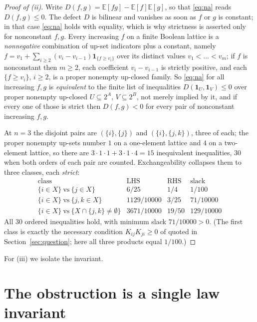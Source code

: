 \documentclass[11pt]{amsart}
\theoremstyle{remark}
\begin{document}
\begin{proof}[Proof of (ii)]
Write $D(f,g)=\mathbb E[fg]-\mathbb E[f]\mathbb E[g]$, so that \eqref{eq:na} reads
$D(f,g)\le0$. The defect $D$ is bilinear and vanishes as soon as $f$ or $g$ is constant; in
that case \eqref{eq:na} holds with equality, which is why strictness is asserted only for
nonconstant $f,g$. Every increasing $f$ on a finite Boolean lattice is a \emph{nonnegative}
combination of up-set indicators plus a constant, namely
$f=v_{1}+\sum_{i\ge2}(v_{i}-v_{i-1})\mathbf 1_{\{f\ge v_{i}\}}$ over its distinct values
$v_{1}<\dots<v_{m}$; if $f$ is nonconstant then $m\ge2$, each coefficient
$v_{i}-v_{i-1}$ is strictly positive, and each $\{f\ge v_{i}\}$, $i\ge2$, is a proper nonempty
up-closed family. So \eqref{eq:na} for all increasing $f,g$ is \emph{equivalent} to the finite
list of inequalities $D(\mathbf 1_{U},\mathbf 1_{V})\le0$ over proper nonempty up-closed
$U\subseteq2^{A}$, $V\subseteq2^{B}$, not merely implied by it, and if every one of those is
strict then $D(f,g)<0$ for every pair of nonconstant increasing $f,g$.

At $n=3$ the disjoint pairs are $(\{i\},\{j\})$ and $(\{i\},\{j,k\})$, three of each; the
proper nonempty up-sets number $1$ on a one-element lattice and $4$ on a two-element
lattice, so there are $3\cdot1\cdot1+3\cdot1\cdot4=15$ inequivalent inequalities, $30$ when
both orders of each pair are counted. Exchangeability collapses them to three classes, each
\emph{strict}:
\[
 \begin{array}{lccc}
  \text{class} & \text{LHS} & \text{RHS} & \text{slack}\\ \hline
  \{i\in X\}\ \text{vs}\ \{j\in X\} & 6/25 & 1/4 & 1/100\\
  \{i\in X\}\ \text{vs}\ \{j,k\in X\} & 1129/10000 & 3/25 & 71/10000\\
  \{i\in X\}\ \text{vs}\ \{X\cap\{j,k\}\ne\emptyset\} & 3671/10000 & 19/50 & 129/10000
 \end{array}
\]
All $30$ ordered inequalities hold, with minimum slack $71/10000>0$. (The first class is
exactly the necessary condition $K_{ij}K_{ji}\ge0$ of \cite{Poinas} quoted in
Section~\ref{sec:question}; here all three products equal $1/100$.)
\end{proof}

For (iii) we isolate the invariant.

\section{The obstruction is a single law invariant}\label{sec:invariant}
\end{document}
